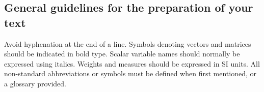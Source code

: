 \documentclass[3p,times,procedia]{elsarticle}
\begin{document}


%
%


\subsection{General guidelines for the preparation of your text}
Avoid hyphenation at the end of a line. Symbols denoting vectors and matrices should be indicated in bold type. Scalar variable names should normally be expressed using italics. Weights and measures should be expressed in SI units. All non-standard abbreviations or symbols must be defined when first mentioned, or a glossary provided.


\end{document}
